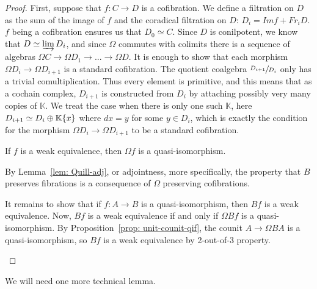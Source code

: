 \documentclass[../thesis.tex]{subfiles}
\begin{document}
            \begin{proof}
                First, suppose that $f: C\rightarrow D$ is a cofibration. We define a filtration on $D$ as the sum of the image of $f$ and the coradical filtration on $D$: $D_i = Imf + Fr_iD$. $f$ being a cofibration ensures us that $D_0 \simeq C$. Since $D$ is conilpotent, we know that $D \simeq \varinjlim D_i$, and since $\Omega$ commutes with colimits there is a sequence of algebras $\Omega C \rightarrow \Omega D_1 \rightarrow ... \rightarrow \Omega D$. It is enough to show that each morphism $\Omega D_i \rightarrow \Omega D_{i+1}$ is a standard cofibration. The quotient coalgebra $\sfrac{D_{i+1}}{D_i}$ only has a trivial comultiplication. Thus every element is primitive, and this means that as a cochain complex, $D_{i+1}$ is constructed from $D_i$ by attaching possibly very many copies of $\mathbb{K}$. We treat the case when there is only one such $\mathbb{K}$, here $D_{i+1} \simeq D_i \oplus \mathbb{K}\{x\}$ where $dx = y$ for some $y\in D_i$, which is exactly the condition for the morphism $\Omega D_i \rightarrow \Omega D_{i+1}$ to be a standard cofibration.

                If $f$ is a weak equivalence, then $\Omega f$ is a quasi-isomorphism.

                By Lemma~\ref{lem: Quill-adj}, or adjointness, more specifically, the property that $B$ preserves fibrations is a consequence of $\Omega$ preserving cofibrations.

                It remains to show that if $f: A\rightarrow B$ is a quasi-isomorphism, then $Bf$ is a weak equivalence. Now, $Bf$ is a weak equivalence if and only if $\Omega Bf$ is a quasi-isomorphism. By Proposition~\ref{prop: unit-counit-qif}, the counit $A \rightarrow \Omega BA$ is a quasi-isomorphism, so $Bf$ is a weak equivalence by 2-out-of-3 property.

                \begin{center}
                \end{center}
            \end{proof}

            We will need one more technical lemma.
\end{document}
